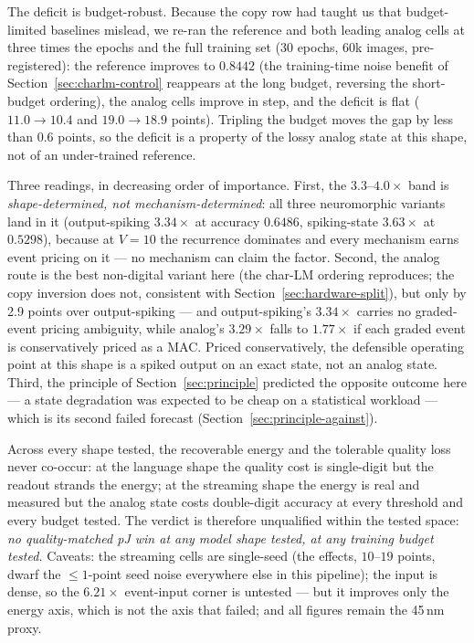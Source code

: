 The deficit is budget-robust. Because the copy row had taught us that budget-limited
baselines mislead, we re-ran the reference and both leading analog cells at three times
the epochs and the full training set ($30$ epochs, $60$k images, pre-registered): the
reference improves to $0.8442$ (the training-time noise benefit of
Section~\ref{sec:charlm-control} reappears at the long budget, reversing the short-budget
ordering), the analog cells improve in step, and the deficit is flat
($11.0 \to 10.4$ and $19.0 \to 18.9$ points). Tripling the budget moves the gap by less
than $0.6$ points, so the deficit is a property of the lossy analog state at this shape,
not of an under-trained reference.

Three readings, in decreasing order of importance. First, the $3.3$--$4.0\times$ band is
\emph{shape-determined, not mechanism-determined}: all three neuromorphic variants land in
it (output-spiking $3.34\times$ at accuracy $0.6486$, spiking-state $3.63\times$ at
$0.5298$), because at $V{=}10$ the recurrence dominates and every mechanism earns event
pricing on it --- no mechanism can claim the factor. Second, the analog route is the best
non-digital variant here (the char-LM ordering reproduces; the copy inversion does not,
consistent with Section~\ref{sec:hardware-split}), but only by 2.9 points over
output-spiking --- and output-spiking's $3.34\times$ carries no graded-event pricing
ambiguity, while analog's $3.29\times$ falls to $1.77\times$ if each graded event is
conservatively priced as a MAC. Priced conservatively, the defensible operating point at
this shape is a spiked output on an exact state, not an analog state. Third, the principle
of Section~\ref{sec:principle} predicted the opposite outcome here --- a state degradation
was expected to be cheap on a statistical workload --- which is its second failed forecast
(Section~\ref{sec:principle-against}).

Across every shape tested, the recoverable energy and the tolerable quality loss never
co-occur: at the language shape the quality cost is single-digit but the readout strands
the energy; at the streaming shape the energy is real and measured but the analog state
costs double-digit accuracy at every threshold and every budget tested. The verdict is
therefore unqualified within the tested space: \emph{no quality-matched pJ win at any
model shape tested, at any training budget tested.} Caveats: the streaming cells are
single-seed (the effects, $10$--$19$ points, dwarf the $\leq 1$-point seed noise
everywhere else in this pipeline); the input is dense, so the $6.21\times$ event-input
corner is untested --- but it improves only the energy axis, which is not the axis that
failed; and all figures remain the 45\,nm proxy.
